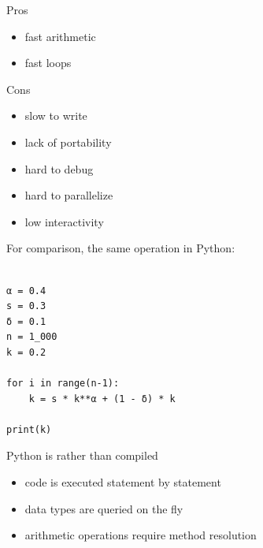 \begin{frame}

    Pros

    \begin{itemize}
        \item fast arithmetic
        \item fast loops
    \end{itemize}


    \vspace{0.5em}

    Cons

    \begin{itemize}
        \item slow to write
        \item lack of portability
        \item hard to debug
        \item hard to parallelize
        \item low interactivity
    \end{itemize}

\end{frame}

\begin{frame}[fragile]


    For comparison, the same operation in Python:
    
    \begin{verbatim}

α = 0.4
s = 0.3
δ = 0.1
n = 1_000
k = 0.2

for i in range(n-1):
    k = s * k**α + (1 - δ) * k

print(k)

    \end{verbatim}

\end{frame}


\begin{frame}
    
    Python is  rather than compiled

    \vspace{0.5em}
    \begin{itemize}
        \item code is executed statement by statement
    \vspace{0.5em}
        \item data types are queried on the fly
    \vspace{0.5em}
        \item arithmetic operations require method resolution
    \end{itemize}

\end{frame}

